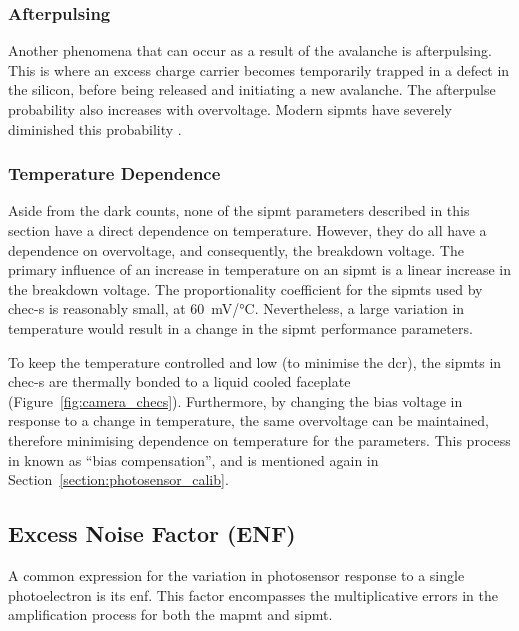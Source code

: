 \subsubsection{Afterpulsing}

Another phenomena that can occur as a result of the avalanche is afterpulsing. This is where an excess charge carrier becomes temporarily trapped in a defect in the silicon, before being released and initiating a new avalanche. The afterpulse probability also increases with overvoltage. Modern \glspl{sipmt} have severely diminished this probability \cite{Ghassemi2017,SensL2011}.

\subsubsection{Temperature Dependence}

Aside from the dark counts, none of the \gls{sipmt} parameters described in this section have a direct dependence on temperature. However, they do all have a dependence on overvoltage, and consequently, the breakdown voltage. The primary influence of an increase in temperature on an \gls{sipmt} is a linear increase in the breakdown voltage. The proportionality coefficient for the \glspl{sipmt} used by \gls{chec-s} is reasonably small, at \SI{60}{mV/\celsius}. Nevertheless, a large variation in temperature would result in a change in the \gls{sipmt} performance parameters.

To keep the temperature controlled and low (to minimise the \gls{dcr}), the \glspl{sipmt} in \gls{chec-s} are thermally bonded to a liquid cooled faceplate (Figure~\ref{fig:camera_checs}). Furthermore, by changing the bias voltage in response to a change in temperature, the same overvoltage can be maintained, therefore minimising dependence on temperature for the parameters. This process in known as ``bias compensation'', and is mentioned again in Section~\ref{section:photosensor_calib}.

\subsection{Excess Noise Factor (ENF)} \label{section:enf}

A common expression for the variation in photosensor response to a single photoelectron is its \gls{enf}. This factor encompasses the multiplicative errors in the amplification process for both the \gls{mapmt} and \gls{sipmt}. 

